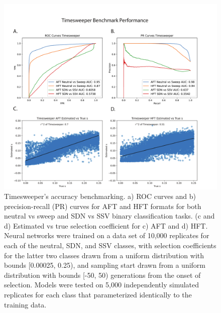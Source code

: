 \begin{figure}
    \centering
    \includegraphics[width=\textwidth]{figures/ch1/Figure_2.pdf}
    \caption[Timesweeper's accuracy benchmarking]{Timesweeper's accuracy benchmarking. a) ROC curves and b) precision-recall (PR) curves for AFT and HFT formats for both neutral vs sweep and SDN vs SSV binary classification tasks. (c and d) Estimated vs true selection coefficient for c) AFT and d) HFT. Neural networks were trained on a data set of 10,000 replicates for each of the neutral, SDN, and SSV classes, with selection coefficients for the latter two classes drawn from a uniform distribution with bounds [0.00025, 0.25), and sampling start drawn from a uniform distribution with bounds [-50, 50) generations from the onset of selection. Models were tested on 5,000 independently simulated replicates for each class that parameterized identically to the training data.}
    \label{fig:TS-F2}
\end{figure}

